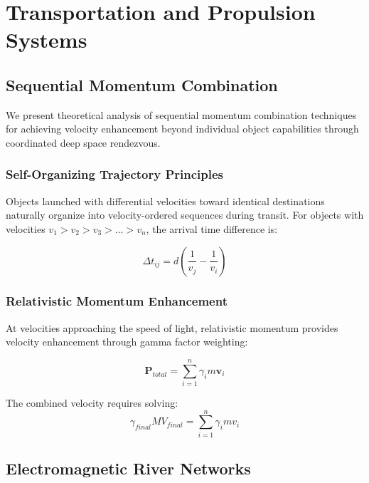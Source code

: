 \documentclass[12pt,a4paper]{article}
\theoremstyle{remark}
\begin{document}
\section{Transportation and Propulsion Systems}

\subsection{Sequential Momentum Combination}

We present theoretical analysis of sequential momentum combination techniques for achieving velocity enhancement beyond individual object capabilities through coordinated deep space rendezvous.

\subsubsection{Self-Organizing Trajectory Principles}

Objects launched with differential velocities toward identical destinations naturally organize into velocity-ordered sequences during transit. For objects with velocities $v_1 > v_2 > v_3 > \ldots > v_n$, the arrival time difference is:

\begin{equation}
\Delta t_{ij} = d\left(\frac{1}{v_j} - \frac{1}{v_i}\right)
\end{equation}

\subsubsection{Relativistic Momentum Enhancement}

At velocities approaching the speed of light, relativistic momentum provides velocity enhancement through gamma factor weighting:

\begin{equation}
\mathbf{P}_{total} = \sum_{i=1}^{n} \gamma_i m \mathbf{v}_i
\end{equation}

The combined velocity requires solving:
\begin{equation}
\gamma_{final} M V_{final} = \sum_{i=1}^{n} \gamma_i m v_i
\end{equation}

\subsection{Electromagnetic River Networks}
\end{document}
